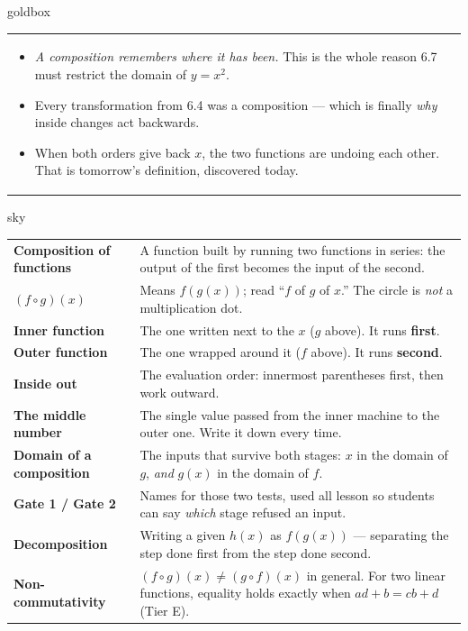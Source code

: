 \documentclass[10pt]{article}
\begin{document}
\begin{skillbox}{goldbox}
\begin{tabularx}{\linewidth}{@{}X|X@{}}
\begin{itemize}[leftmargin=1.1em, nosep, after=\vspace{2pt}]
  \item \emph{A composition remembers where it has been.} This is the whole reason 6.7 must restrict the domain of $y=x^{2}$.
  \item Every transformation from 6.4 was a composition --- which is finally \emph{why} inside changes act backwards.
  \item When both orders give back $x$, the two functions are undoing each other. That is tomorrow's definition, discovered today.
\end{itemize}
\end{tabularx}
\end{skillbox}

\begin{skillbox}{sky}
\renewcommand{\arraystretch}{1.3}
\begin{tabularx}{\linewidth}{@{}l X@{}}
\textbf{Composition of functions} & A function built by running two functions in series: the output of the first becomes the input of the second. \\
\textbf{$(f\circ g)(x)$} & Means $f(g(x))$; read ``$f$ of $g$ of $x$.'' The circle is \emph{not} a multiplication dot. \\
\textbf{Inner function} & The one written next to the $x$ ($g$ above). It runs \textbf{first}. \\
\textbf{Outer function} & The one wrapped around it ($f$ above). It runs \textbf{second}. \\
\textbf{Inside out} & The evaluation order: innermost parentheses first, then work outward. \\
\textbf{The middle number} & The single value passed from the inner machine to the outer one. Write it down every time. \\
\textbf{Domain of a composition} & The inputs that survive both stages: $x$ in the domain of $g$, \emph{and} $g(x)$ in the domain of $f$. \\
\textbf{Gate 1 / Gate 2} & Names for those two tests, used all lesson so students can say \emph{which} stage refused an input. \\
\textbf{Decomposition} & Writing a given $h(x)$ as $f(g(x))$ --- separating the step done first from the step done second. \\
\textbf{Non-commutativity} & $(f\circ g)(x)\ne(g\circ f)(x)$ in general. For two linear functions, equality holds exactly when $ad+b=cb+d$ (Tier E). \\
\end{tabularx}
\end{skillbox}
\end{document}
